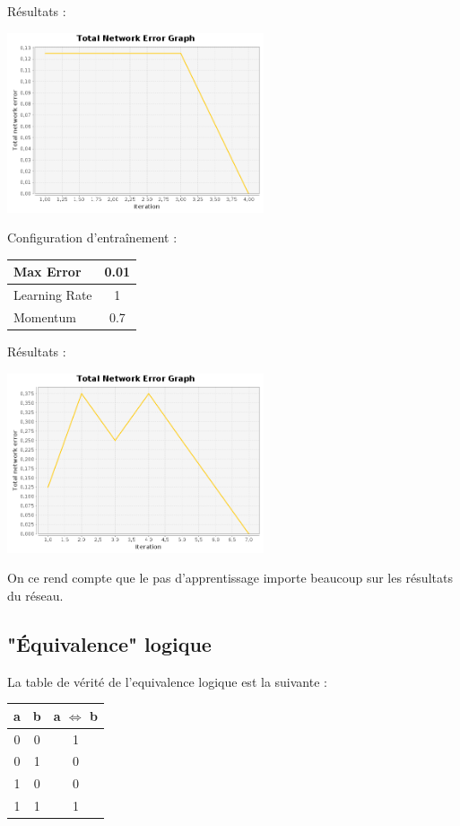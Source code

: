 \documentclass[10pt]{report}
\begin{document}
Résultats :\\
\begin{center}
\includegraphics[height=200px]{img/AND_EG_3.png}\\
\end{center}

Configuration d'entraînement :\\
\begin{tabular}{|l|c|}
	\hline
	Max Error & 0.01 \\
	\hline
	Learning Rate & 1 \\
	\hline
	Momentum & 0.7 \\
	\hline
\end{tabular}

Résultats :\\
\begin{center}
\includegraphics[height=200px]{img/AND_EG_4.png}\\
\end{center}

On ce rend compte que le pas d'apprentissage importe beaucoup sur les résultats du réseau.
 
\subsection{"Équivalence" logique}
La table de vérité de l'equivalence logique est la suivante :\\

\begin{center}
\begin{tabular}{|c|c|c|}
	\hline
	a & b & a $\iff$ b \\
	\hline
	0 & 0 & 1 \\
	\hline
	0 & 1 & 0 \\
	\hline
	1 & 0 & 0 \\
	\hline
	1 & 1 & 1 \\
	\hline
\end{tabular}
\end{center}
\end{document}
